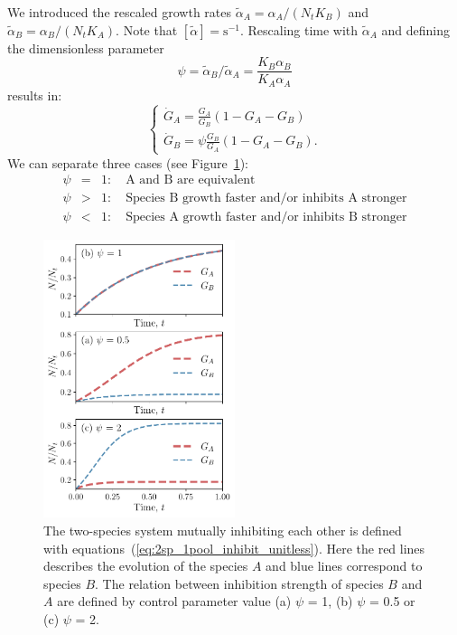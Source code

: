 \documentclass[10pt,A4paper]{article}
\numberwithin{equation}{section}
\begin{document}
We introduced the rescaled growth rates $\tilde{\alpha}_A=\alpha_A/(N_tK_B)$ and $\tilde{\alpha}_B=\alpha_B/(N_tK_A)$. Note that $[\tilde{\alpha}]=\mathrm{s}^{-1}$.
Rescaling time with $\tilde{\alpha}_A$ and defining the dimensionless parameter
\begin{equation}
    \psi = \tilde{\alpha}_B/\tilde{\alpha}_A = \frac{K_B\alpha_B}{K_A\alpha_A}
\label{eq:ode_inhib_psi}
\end{equation}
results in: 
\begin{equation}
    \begin{cases}
    \dot{G}_A =\frac{G_A}{G_B}\left(1 - G_A-G_B\right)\\
    \dot{G}_B =\psi\frac{G_B}{G_A}\left(1-G_A-G_B\right). 
    \end{cases}
\label{eq:2sp_1pool_inhibit_unitless}
\end{equation}
We can separate three cases (see Figure~\ref{fig:1pool_2sp_inhibit}):
\begin{eqnarray}
    \psi&=&1:\quad\text{A and B are equivalent}\\
    \psi&>&1:\quad\text{Species B growth faster and/or inhibits A stronger}\\
    \psi&<&1:\quad\text{Species A growth faster and/or inhibits B stronger}
\end{eqnarray}
%
\begin{figure}[H]
    \begin{center}
    \includegraphics[width=0.5\textwidth]{Figures/pool_model_1pool_inhib.pdf}
    \caption{
        The two-species system mutually inhibiting each other is defined with equations~(\ref{eq:2sp_1pool_inhibit_unitless}).
        Here the red lines describes the evolution of the species $A$ and blue lines correspond to species $B$.
        The relation between inhibition strength of species $B$ and $A$ are defined by control parameter value (a) $\psi$ = 1, (b) $\psi$ = 0.5 or (c) $\psi$ = 2.
    }
    \label{fig:1pool_2sp_inhibit}
    \end{center}
\end{figure}
%
%
%
\end{document}
